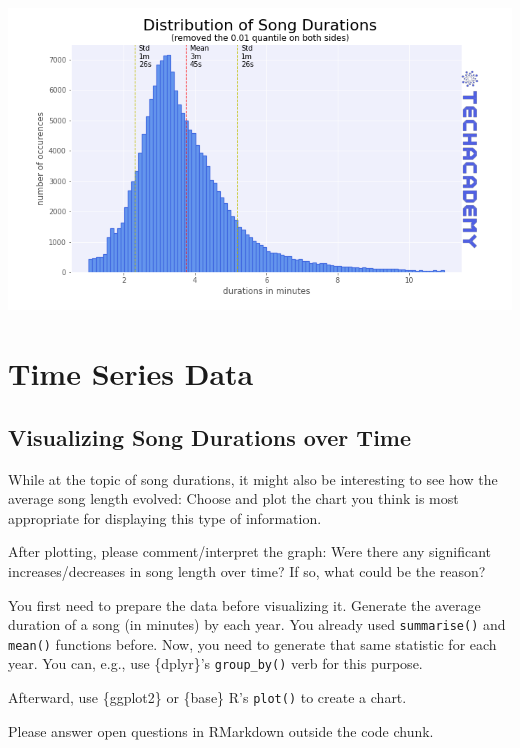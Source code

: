 \documentclass[
  11pt,
]{book}
\newenvironment{tips}[1]
  {
  \begin{itemize}
  \footnotesize
  \renewcommand{\labelitemi}{
    \raisebox{-.7\height}[0pt][0pt]{
      {\setkeys{Gin}{width=3em,keepaspectratio}
        \texttt{[image: images/\#1.png]}}
    }
  }
  \setlength{\fboxsep}{1em}
  \begin{rbox}
  \item
  }
  {
  \end{rbox}
  \end{itemize}
  }
\begin{document}
\begin{center}\includegraphics[width=1\linewidth]{splots/durations (3)} \end{center}

\hypertarget{time-series-data}{%
\section{Time Series Data}\label{time-series-data}}

\hypertarget{visualizing-song-durations-over-time}{%
\subsection{Visualizing Song Durations over Time}\label{visualizing-song-durations-over-time}}

While at the topic of song durations, it might also be interesting to see how the average song length evolved: Choose and plot the chart you think is most appropriate for displaying this type of information.

After plotting, please comment/interpret the graph: Were there any significant increases/decreases in song length over time? If so, what could be the reason?

\begin{tips}r

You first need to prepare the data before visualizing it. Generate the average duration of a song (in minutes) by each year. You already used \texttt{summarise()} and \texttt{mean()} functions before. Now, you need to generate that same statistic for each year. You can, e.g., use \{dplyr\}'s \texttt{group\_by()} verb for this purpose.

Afterward, use \{ggplot2\} or \{base\} R's \texttt{plot()} to create a chart.

Please answer open questions in RMarkdown outside the code chunk.

\end{tips}
\end{document}
